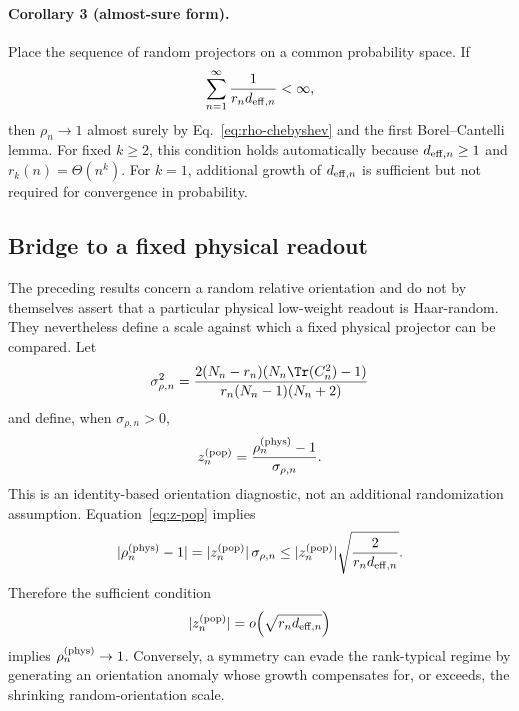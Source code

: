 \paragraph{Corollary 3 (almost-sure form).}
Place the sequence of random projectors on a common probability space.  If
\begin{equation}
 \sum_{n=1}^{\infty}\frac{1}{r_n d_{{\rm eff},n}}<\infty,
\end{equation}
then $\rho_n\to1$ almost surely by Eq.~\eqref{eq:rho-chebyshev} and the first Borel--Cantelli lemma.  For fixed $k\ge2$, this condition holds automatically because $d_{{\rm eff},n}\ge1$ and $r_k(n)=\Theta(n^k)$.  For $k=1$, additional growth of $d_{{\rm eff},n}$ is sufficient but not required for convergence in probability.

\subsection{Bridge to a fixed physical readout}
\label{sec:physical-orientation-bridge}

The preceding results concern a random relative orientation and do not by themselves assert that a particular physical low-weight readout is Haar-random.  They nevertheless define a scale against which a fixed physical projector can be compared.  Let
\begin{equation}
 \sigma_{\rho,n}^2
 =\frac{2(N_n-r_n)(N_n\Tr(C_n^2)-1)}
 {r_n(N_n-1)(N_n+2)}
\end{equation}
and define, when $\sigma_{\rho,n}>0$,
\begin{equation}
 z_n^{\rm(pop)}
 =\frac{\rho_n^{\rm(phys)}-1}{\sigma_{\rho,n}}.
 \label{eq:z-pop}
\end{equation}
This is an identity-based orientation diagnostic, not an additional randomization assumption.  Equation~\eqref{eq:z-pop} implies
\begin{equation}
 |\rho_n^{\rm(phys)}-1|
 =|z_n^{\rm(pop)}|\,\sigma_{\rho,n}
 \le |z_n^{\rm(pop)}|\sqrt{\frac{2}{r_nd_{{\rm eff},n}}}.
 \label{eq:physical-bridge-bound}
\end{equation}
Therefore the sufficient condition
\begin{equation}
 |z_n^{\rm(pop)}|=o\!\left(\sqrt{r_nd_{{\rm eff},n}}\right)
\end{equation}
implies $\rho_n^{\rm(phys)}\to1$.  Conversely, a symmetry can evade the rank-typical regime by generating an orientation anomaly whose growth compensates for, or exceeds, the shrinking random-orientation scale.

